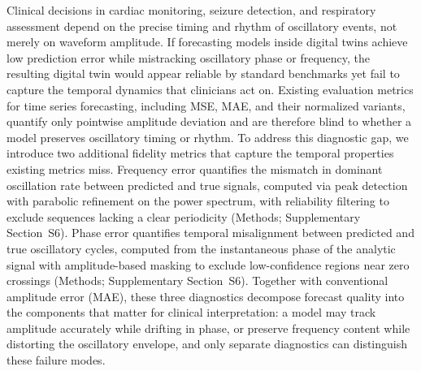 Clinical decisions in cardiac monitoring, seizure detection, and respiratory assessment depend on the precise timing and rhythm of oscillatory events, not merely on waveform amplitude. If forecasting models inside digital twins achieve low prediction error while mistracking oscillatory phase or frequency, the resulting digital twin would appear reliable by standard benchmarks yet fail to capture the temporal dynamics that clinicians act on. Existing evaluation metrics for time series forecasting, including MSE, MAE, and their normalized variants, quantify only pointwise amplitude deviation and are therefore blind to whether a model preserves oscillatory timing or rhythm. To address this diagnostic gap, we introduce two additional fidelity metrics that capture the temporal properties existing metrics miss. Frequency error quantifies the mismatch in dominant oscillation rate between predicted and true signals, computed via peak detection with parabolic refinement on the power spectrum, with reliability filtering to exclude sequences lacking a clear periodicity (Methods; Supplementary Section~S6). Phase error quantifies temporal misalignment between predicted and true oscillatory cycles, computed from the instantaneous phase of the analytic signal with amplitude-based masking to exclude low-confidence regions near zero crossings (Methods; Supplementary Section~S6). Together with conventional amplitude error (MAE), these three diagnostics decompose forecast quality into the components that matter for clinical interpretation: a model may track amplitude accurately while drifting in phase, or preserve frequency content while distorting the oscillatory envelope, and only separate diagnostics can distinguish these failure modes.

